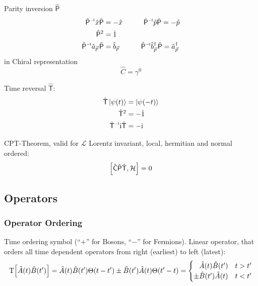 			\noindent
			Parity inversion $\hat{\mathsf{P}}$
			\begin{equation}
				\begin{aligned}
					\inv{\hat{\mathsf{P}}} \hat{x} \hat{\mathsf{P}} &= - \hat{x}
					\hsp \inv{\hat{\mathsf{P}}} \hat{p} \hat{\mathsf{P}} = - \hat{p} \\
					\hat{\mathsf{P}}^2 &= \hat{1} \\
					\inv{\hat{\mathsf{P}}}\hat{a}_{\vec{p}} \hat{\mathsf{P}} &= \hat{b}_{\vec{p}}
					\hsp \inv{\hat{\mathsf{P}}}\hat{b}^\dagger_{\vec{p}} \hat{\mathsf{P}} = \hat{a} ^\dagger_{\vec{p}} \\
				\end{aligned}
			\end{equation}
			in Chiral representation
			\begin{equation}
				\hat{C} = \gamma^0
			\end{equation}

			\noindent
			Time reversal $\hat{\mathsf{T}}$:
			\begin{equation}
				\begin{aligned}
					\hat{\mathsf{T}} \Ket{\psi(t)} &= \Ket{\psi(-t)} \\
					\hat{\mathsf{T}}^2 &= - \hat{1} \\
					\inv{\hat{\mathsf{T}}} \i \hat{\mathsf{T}} &= -\i \\
				\end{aligned}
			\end{equation}

			\noindent
			CPT-Theorem, valid for $\mathcal{L}$ Lorentz invariant, local, hermitian and normal ordered:
			\begin{equation}
				\comm{\hat{\mathsf{C}}\hat{\mathsf{P}}\hat{\mathsf{T}}}{\mathcal{H}} = 0
			\end{equation}



	\subsection{Operators}
		\subsubsection{Operator Ordering}
			Time ordering symbol (``$+$'' for Bosons, ``$-$'' for Fermions). Linear operator, that orders all time dependent operators from right (earliest) to left (latest):
			\begin{equation}
				\mathrm{T}\qty[\hat{A}(t)\hat{B}(t')]
				= \hat{A}(t) \hat{B}(t') \Theta(t-t') \pm \hat{B}(t') \hat{A}(t) \Theta(t'-t)
				= \begin{cases}
					\phantom{\pm} \hat{A}(t) \hat{B}(t') & t>t' \\
					\pm \hat{B}(t') \hat{A}(t) & t<t'
				\end{cases}
			\end{equation}

